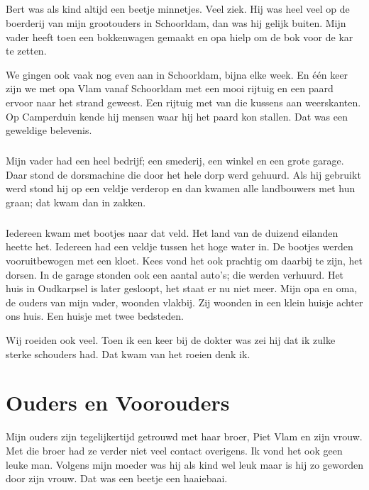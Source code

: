 \paragraph{}

Bert was als kind altijd een beetje minnetjes. Veel ziek. Hij was heel veel op de boerderij van mijn grootouders in Schoorldam, dan was hij gelijk buiten. 
Mijn vader heeft toen een bokkenwagen gemaakt en opa hielp om de bok voor de kar te zetten.

We gingen ook vaak nog even aan in Schoorldam, bijna elke week.
En één keer zijn we met opa Vlam vanaf Schoorldam met een mooi rijtuig en een paard ervoor naar het strand geweest. Een rijtuig met van die kussens aan weerskanten. Op Camperduin kende hij mensen waar hij het paard kon stallen. Dat was een geweldige belevenis.

\paragraph{}

Mijn vader had een heel bedrijf; een smederij, een winkel en een grote garage. Daar stond de dorsmachine die door het hele dorp werd gehuurd. Als hij gebruikt werd stond hij op een veldje verderop en dan kwamen alle landbouwers met hun graan; dat kwam dan in zakken. 

\paragraph{}

Iedereen kwam met bootjes naar dat veld. Het land van de duizend eilanden heette het.  Iedereen had een veldje tussen het hoge water in. De bootjes werden vooruitbewogen met een kloet. Kees vond het ook prachtig om daarbij te zijn, het dorsen.
In de garage stonden ook een aantal auto’s; die werden verhuurd.
Het huis in Oudkarpsel is later gesloopt, het staat er nu niet meer. Mijn opa en oma, de ouders van mijn vader, woonden vlakbij. Zij woonden in een klein huisje achter ons huis. Een huisje met twee bedsteden.

Wij roeiden ook veel. Toen ik een keer bij de dokter was zei hij dat ik zulke sterke schouders had. Dat kwam van het roeien denk ik.

\chapter{Ouders en Voorouders}

Mijn ouders zijn tegelijkertijd getrouwd met haar broer, Piet Vlam en zijn vrouw. 
Met die broer had ze verder niet veel contact overigens. Ik vond het ook geen leuke man. Volgens mijn moeder was hij als kind wel leuk maar is hij zo geworden door zijn vrouw. Dat was een beetje een haaiebaai.

